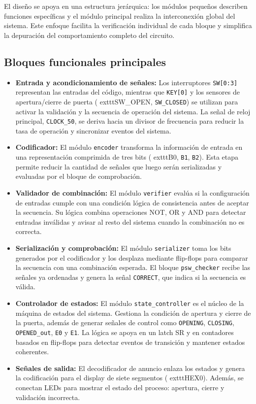 \documentclass[12pt,letterpaper]{article}
\begin{document}
El diseño se apoya en una estructura jerárquica: los módulos pequeños describen funciones específicas y el módulo principal realiza la interconexión global del sistema. Este enfoque facilita la verificación individual de cada bloque y simplifica la depuración del comportamiento completo del circuito.

\subsection{Bloques funcionales principales}

\begin{itemize}[leftmargin=1.5em]
    \item \textbf{Entrada y acondicionamiento de señales:} Los interruptores \texttt{SW[0:3]} representan las entradas del código, mientras que \texttt{KEY[0]} y los sensores de apertura/cierre de puerta (	exttt{SW\_OPEN}, \texttt{SW\_CLOSED}) se utilizan para activar la validación y la secuencia de operación del sistema. La señal de reloj principal, \texttt{CLOCK\_50}, se deriva hacia un divisor de frecuencia para reducir la tasa de operación y sincronizar eventos del sistema.

    \item \textbf{Codificador:} El módulo \texttt{encoder} transforma la información de entrada en una representación comprimida de tres bits (	exttt{B0}, \texttt{B1}, \texttt{B2}). Esta etapa permite reducir la cantidad de señales que luego serán serializadas y evaluadas por el bloque de comprobación.

    \item \textbf{Validador de combinación:} El módulo \texttt{verifier} evalúa si la configuración de entradas cumple con una condición lógica de consistencia antes de aceptar la secuencia. Su lógica combina operaciones NOT, OR y AND para detectar entradas inválidas y avisar al resto del sistema cuando la combinación no es correcta.

    \item \textbf{Serialización y comprobación:} El módulo \texttt{serializer} toma los bits generados por el codificador y los desplaza mediante flip-flops para comparar la secuencia con una combinación esperada. El bloque \texttt{psw\_checker} recibe las señales ya ordenadas y genera la señal \texttt{CORRECT}, que indica si la secuencia es válida.

    \item \textbf{Controlador de estados:} El módulo \texttt{state\_controller} es el núcleo de la máquina de estados del sistema. Gestiona la condición de apertura y cierre de la puerta, además de generar señales de control como \texttt{OPENING}, \texttt{CLOSING}, \texttt{OPENED\_out}, \texttt{E0} y \texttt{E1}. La lógica se apoya en un latch SR y en contadores basados en flip-flops para detectar eventos de transición y mantener estados coherentes.

    \item \textbf{Señales de salida:} El decodificador de anuncio enlaza los estados y genera la codificación para el display de siete segmentos (	exttt{HEX0}). Además, se conectan LEDs para mostrar el estado del proceso: apertura, cierre y validación incorrecta.
\end{itemize}
\end{document}
